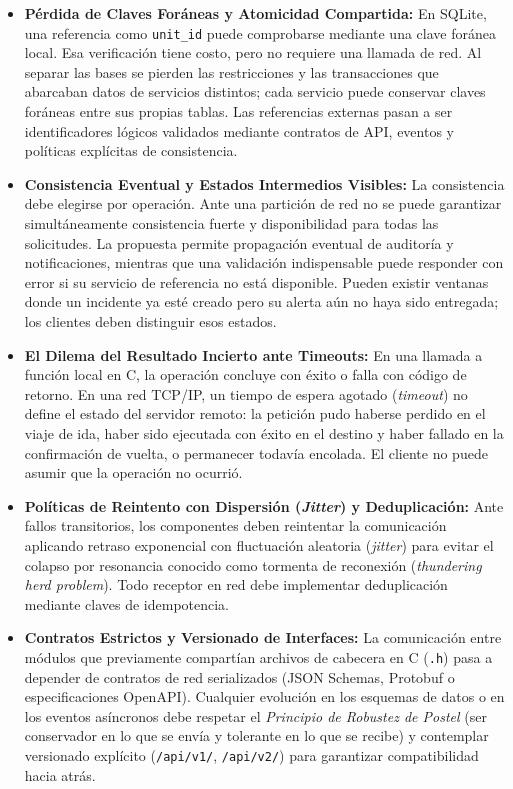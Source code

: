 \documentclass[10pt,a4paper]{article}
\begin{document}
\begin{itemize}[leftmargin=*]
    \item \textbf{Pérdida de Claves Foráneas y Atomicidad Compartida:} En SQLite, una referencia como \texttt{unit\_id} puede comprobarse mediante una clave foránea local. Esa verificación tiene costo, pero no requiere una llamada de red. Al separar las bases se pierden las restricciones y las transacciones que abarcaban datos de servicios distintos; cada servicio puede conservar claves foráneas entre sus propias tablas. Las referencias externas pasan a ser identificadores lógicos validados mediante contratos de API, eventos y políticas explícitas de consistencia.
    \item \textbf{Consistencia Eventual y Estados Intermedios Visibles:} La consistencia debe elegirse por operación. Ante una partición de red no se puede garantizar simultáneamente consistencia fuerte y disponibilidad para todas las solicitudes. La propuesta permite propagación eventual de auditoría y notificaciones, mientras que una validación indispensable puede responder con error si su servicio de referencia no está disponible. Pueden existir ventanas donde un incidente ya esté creado pero su alerta aún no haya sido entregada; los clientes deben distinguir esos estados.
    \item \textbf{El Dilema del Resultado Incierto ante Timeouts:} En una llamada a función local en C, la operación concluye con éxito o falla con código de retorno. En una red TCP/IP, un tiempo de espera agotado (\textit{timeout}) no define el estado del servidor remoto: la petición pudo haberse perdido en el viaje de ida, haber sido ejecutada con éxito en el destino y haber fallado en la confirmación de vuelta, o permanecer todavía encolada. El cliente no puede asumir que la operación no ocurrió.
    \item \textbf{Políticas de Reintento con Dispersión (\textit{Jitter}) y Deduplicación:} Ante fallos transitorios, los componentes deben reintentar la comunicación aplicando retraso exponencial con fluctuación aleatoria (\textit{jitter}) para evitar el colapso por resonancia conocido como tormenta de reconexión (\textit{thundering herd problem}). Todo receptor en red debe implementar deduplicación mediante claves de idempotencia.
    \item \textbf{Contratos Estrictos y Versionado de Interfaces:} La comunicación entre módulos que previamente compartían archivos de cabecera en C (\texttt{.h}) pasa a depender de contratos de red serializados (JSON Schemas, Protobuf o especificaciones OpenAPI). Cualquier evolución en los esquemas de datos o en los eventos asíncronos debe respetar el \textit{Principio de Robustez de Postel} (ser conservador en lo que se envía y tolerante en lo que se recibe) y contemplar versionado explícito (\texttt{/api/v1/}, \texttt{/api/v2/}) para garantizar compatibilidad hacia atrás.

\end{itemize}
\end{document}

